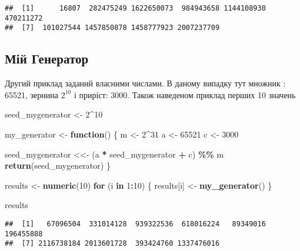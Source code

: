 \documentclass[
]{article}
\newenvironment{Shaded}{\begin{snugshade}}{\end{snugshade}}
\newcommand{\ControlFlowTok}[1]{\textcolor[rgb]{0.13,0.29,0.53}{\textbf{#1}}}
\newcommand{\DecValTok}[1]{\textcolor[rgb]{0.00,0.00,0.81}{#1}}
\newcommand{\FunctionTok}[1]{\textcolor[rgb]{0.13,0.29,0.53}{\textbf{#1}}}
\newcommand{\NormalTok}[1]{#1}
\newcommand{\OtherTok}[1]{\textcolor[rgb]{0.56,0.35,0.01}{#1}}
\newcommand{\SpecialCharTok}[1]{\textcolor[rgb]{0.81,0.36,0.00}{\textbf{#1}}}
\begin{document}
\begin{verbatim}
##  [1]      16807  282475249 1622650073  984943658 1144108930  470211272
##  [7]  101027544 1457850878 1458777923 2007237709
\end{verbatim}

\hypertarget{ux43cux456ux439-ux433ux435ux43dux435ux440ux430ux442ux43eux440}{%
\subsection{Мій
Генератор}\label{ux43cux456ux439-ux433ux435ux43dux435ux440ux430ux442ux43eux440}}

Другий приклад заданий власними числами. В даному випадку тут множник :
65521, зернина \(2^{10}\) і приріст: 3000. Також наведеном приклад
перших 10 значень

\begin{Shaded}
\begin{Highlighting}[]
\NormalTok{seed\_mygenerator }\OtherTok{\textless{}{-}} \DecValTok{2}\SpecialCharTok{\^{}}\DecValTok{10}

\NormalTok{my\_generator }\OtherTok{\textless{}{-}} \ControlFlowTok{function}\NormalTok{() \{}
\NormalTok{  m }\OtherTok{\textless{}{-}} \DecValTok{2}\SpecialCharTok{\^{}}\DecValTok{31}
\NormalTok{  a }\OtherTok{\textless{}{-}} \DecValTok{65521}
\NormalTok{  c }\OtherTok{\textless{}{-}} \DecValTok{3000}
  
\NormalTok{  seed\_mygenerator }\OtherTok{\textless{}\textless{}{-}}\NormalTok{ (a }\SpecialCharTok{*}\NormalTok{ seed\_mygenerator }\SpecialCharTok{+}\NormalTok{ c) }\SpecialCharTok{\%\%}\NormalTok{ m}
  \FunctionTok{return}\NormalTok{(seed\_mygenerator)}
\NormalTok{\}}

\NormalTok{results }\OtherTok{\textless{}{-}} \FunctionTok{numeric}\NormalTok{(}\DecValTok{10}\NormalTok{)}
\ControlFlowTok{for}\NormalTok{ (i }\ControlFlowTok{in} \DecValTok{1}\SpecialCharTok{:}\DecValTok{10}\NormalTok{) \{}
\NormalTok{  results[i] }\OtherTok{\textless{}{-}} \FunctionTok{my\_generator}\NormalTok{()}
\NormalTok{\}}

\NormalTok{results}
\end{Highlighting}
\end{Shaded}

\begin{verbatim}
##  [1]   67096504  331014128  939322536  618016224   89349016  196455888
##  [7] 2116738184 2013601728  393424760 1337476016
\end{verbatim}
\end{document}
